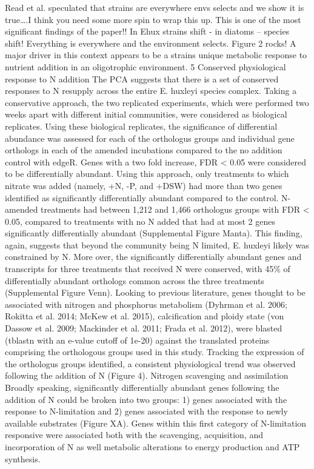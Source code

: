 Read et al. speculated that strains are everywhere envs selects and we show it is true….I think you need some more spin to wrap this up.  This is one of the most significant findings of the paper!!  In Ehux strains shift  - in diatoms – species shift!  Everything is everywhere and the environment selects. Figure 2 rocks! A major driver in this context appears to be a strains unique metabolic response to nutrient addition in an oligotrophic environment.  
5
Conserved physiological response to N addition
The PCA suggests that there is a set of conserved responses to N resupply across the entire E. huxleyi species complex. Taking a conservative approach, the two replicated experiments, which were performed two weeks apart with different initial communities, were considered as biological replicates. Using these biological replicates, the significance of differential abundance was assessed for each of the orthologus groups and individual gene orthologs in each of the amended incubations compared to the no addition control with edgeR. Genes with a two fold increase, FDR < 0.05 were considered to be differentially abundant. Using this approach, only treatments to which nitrate was added (namely, +N, -P, and +DSW) had more than two genes identified as significantly differentially abundant compared to the control. N-amended treatments had between 1,212 and 1,466 orthologus groups with FDR < 0.05, compared to treatments with no N added that had at most 2 genes significantly differentially abundant (Supplemental Figure Manta). This finding, again, suggests that beyond the community being N limited, E. huxleyi likely was constrained by N. More over, the significantly differentially abundant genes and transcripts for three treatments that received N were conserved, with 45\% of differentially abundant orthologs common across the three treatments (Supplemental Figure Venn). Looking to previous literature, genes thought to be associated with nitrogen and phosphorus metabolism (Dyhrman et al. 2006; Rokitta et al. 2014; McKew et al. 2015), calcification and ploidy state (von Dassow et al. 2009; Mackinder et al. 2011; Frada et al. 2012), were blasted (tblastn with an e-value cutoff of 1e-20) against the translated proteins comprising the orthologous groups used in this study. Tracking the expression of the orthologus groups identified, a consistent physiological trend was observed following the addition of N (Figure 4). 
Nitrogen scavenging and assimilation
Broadly speaking, significantly differentially abundant genes following the addition of N could be broken into two groups: 1) genes associated with the response to N-limitation and 2) genes associated with the response to newly available substrates (Figure XA). Genes within this first category of N-limitation responsive were associated both with the scavenging, acquisition, and incorporation of N as well metabolic alterations to energy production and ATP synthesis.
